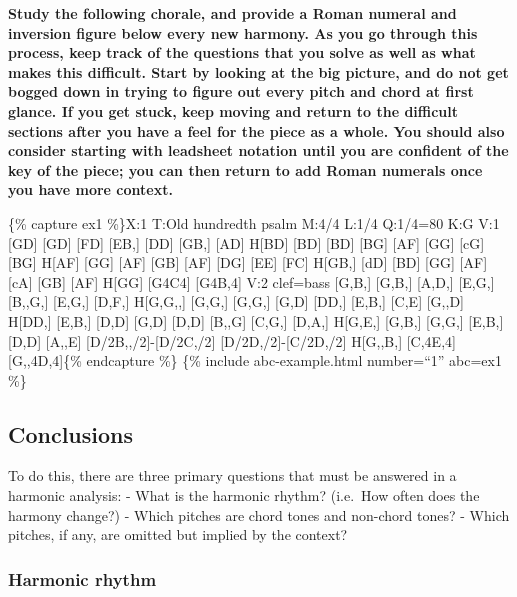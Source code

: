 \documentclass{book}
\begin{document}
\textbf{Study the following chorale, and provide a Roman numeral and inversion
figure below every new harmony. As you go through this process, keep track of
the questions that you solve as well as what makes this difficult. Start by
looking at the big picture, and do not get bogged down in trying to figure out
every pitch and chord at first glance. If you get stuck, keep moving and
return to the difficult sections after you have a feel for the piece as a
whole. You should also consider starting with leadsheet notation until you are
confident of the key of the piece; you can then return to add Roman numerals
once you have more context.}

\{\% capture ex1 \%\}X:1 T:Old hundredth psalm M:4/4 L:1/4 Q:1/4=80 K:G V:1
{[}GD{]}\textbar{} {[}GD{]} {[}FD{]} {[}EB,{]} {[}DD{]}\textbar{} {[}GB,{]}
{[}AD{]} H{[}BD{]} {[}BD{]}\textbar{} {[}BD{]} {[}BG{]} {[}AF{]}
{[}GG{]}\textbar{} {[}cG{]} {[}BG{]} H{[}AF{]} {[}GG{]}\textbar{} {[}AF{]}
{[}GB{]} {[}AF{]} {[}DG{]}\textbar{} {[}EE{]} {[}FC{]} H{[}GB,{]}
{[}dD{]}\textbar{} {[}BD{]} {[}GG{]} {[}AF{]} {[}cA{]}\textbar{} {[}GB{]}
{[}AF{]} H{[}GG{]}\textbar\textbar{} {[}G4C4{]}\textbar{}
{[}G4B,4{]}\textbar{]} V:2 clef=bass {[}G,B,{]}\textbar{} {[}G,B,{]}
{[}A,D,{]} {[}E,G,{]} {[}B,,G,{]}\textbar{} {[}E,G,{]} {[}D,F,{]} H{[}G,G,,{]}
{[}G,G,{]}\textbar{} {[}G,G,{]} {[}G,D{]} {[}DD,{]} {[}E,B,{]}\textbar{}
{[}C,E{]} {[}G,,D{]} H{[}DD,{]} {[}E,B,{]}\textbar{} {[}D,D{]} {[}G,D{]}
{[}D,D{]} {[}B,,G{]}\textbar{} {[}C,G,{]} {[}D,A,{]} H{[}G,E,{]}
{[}G,B,{]}\textbar{} {[}G,G,{]} {[}E,B,{]} {[}D,D{]} {[}A,,E{]}\textbar{}
{[}D/2B,,/2{]}-{[}D/2C,/2{]} {[}D/2D,/2{]}-{[}C/2D,/2{]}
H{[}G,,B,{]}\textbar\textbar{} {[}C,4E,4{]}\textbar{}
{[}G,,4D,4{]}\textbar{]}\{\% endcapture \%\} \{\% include abc-example.html
number=``1'' abc=ex1 \%\}

\hypertarget{conclusions-35}{%
\subsection{Conclusions}\label{conclusions-35}}

To do this, there are three primary questions that must be answered in a
harmonic analysis: - What is the harmonic rhythm? (i.e.~How often does the
harmony change?) - Which pitches are chord tones and non-chord tones? - Which
pitches, if any, are omitted but implied by the context?

\hypertarget{harmonic-rhythm}{%
\subsubsection{Harmonic rhythm}\label{harmonic-rhythm}}
\end{document}
